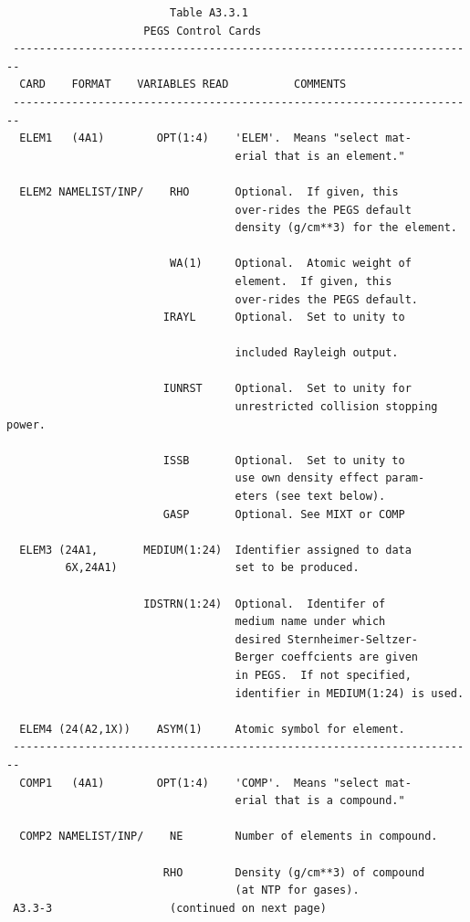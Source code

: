 \newpage {} \begin{verbatim}
                         Table A3.3.1
                     PEGS Control Cards
 -----------------------------------------------------------------------
  CARD    FORMAT    VARIABLES READ          COMMENTS
 -----------------------------------------------------------------------
  ELEM1   (4A1)        OPT(1:4)    'ELEM'.  Means "select mat-
                                   erial that is an element."

  ELEM2 NAMELIST/INP/    RHO       Optional.  If given, this
                                   over-rides the PEGS default
                                   density (g/cm**3) for the element.

                         WA(1)     Optional.  Atomic weight of
                                   element.  If given, this
                                   over-rides the PEGS default.
                        IRAYL      Optional.  Set to unity to

                                   included Rayleigh output.

                        IUNRST     Optional.  Set to unity for
                                   unrestricted collision stopping power.

                        ISSB       Optional.  Set to unity to
                                   use own density effect param-
                                   eters (see text below).
                        GASP       Optional. See MIXT or COMP

  ELEM3 (24A1,       MEDIUM(1:24)  Identifier assigned to data
         6X,24A1)                  set to be produced.

                     IDSTRN(1:24)  Optional.  Identifer of
                                   medium name under which
                                   desired Sternheimer-Seltzer-
                                   Berger coeffcients are given
                                   in PEGS.  If not specified,
                                   identifier in MEDIUM(1:24) is used.

  ELEM4 (24(A2,1X))    ASYM(1)     Atomic symbol for element.
 -----------------------------------------------------------------------
  COMP1   (4A1)        OPT(1:4)    'COMP'.  Means "select mat-
                                   erial that is a compound."

  COMP2 NAMELIST/INP/    NE        Number of elements in compound.

                        RHO        Density (g/cm**3) of compound
                                   (at NTP for gases).
 A3.3-3                  (continued on next page)
\end{verbatim}

